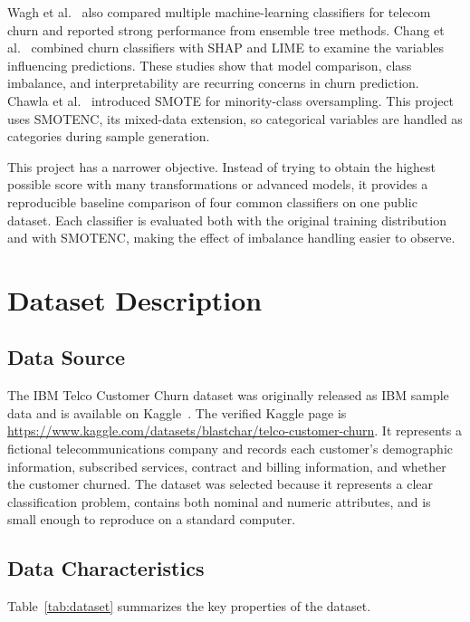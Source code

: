 \documentclass[conference]{IEEEtran}
\begin{document}
	Wagh et al.~\cite{b5} also compared multiple machine-learning classifiers for telecom churn and reported strong performance from ensemble tree methods. Chang et al.~\cite{b6} combined churn classifiers with SHAP and LIME to examine the variables influencing predictions. These studies show that model comparison, class imbalance, and interpretability are recurring concerns in churn prediction. Chawla et al.~\cite{b4} introduced SMOTE for minority-class oversampling. This project uses SMOTENC, its mixed-data extension, so categorical variables are handled as categories during sample generation.
	
	This project has a narrower objective. Instead of trying to obtain the highest possible score with many transformations or advanced models, it provides a reproducible baseline comparison of four common classifiers on one public dataset. Each classifier is evaluated both with the original training distribution and with SMOTENC, making the effect of imbalance handling easier to observe.
	
	\section{Dataset Description}
	\label{sec:dataset}
	
	\subsection{Data Source}
	The IBM Telco Customer Churn dataset was originally released as IBM sample data and is available on Kaggle~\cite{b7,b8}. The verified Kaggle page is \url{https://www.kaggle.com/datasets/blastchar/telco-customer-churn}. It represents a fictional telecommunications company and records each customer's demographic information, subscribed services, contract and billing information, and whether the customer churned. The dataset was selected because it represents a clear classification problem, contains both nominal and numeric attributes, and is small enough to reproduce on a standard computer.
	
	\subsection{Data Characteristics}
	Table~\ref{tab:dataset} summarizes the key properties of the dataset.
	
\end{document}
